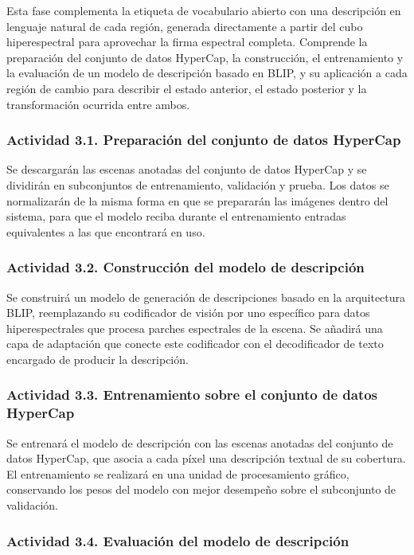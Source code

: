 Esta fase complementa la etiqueta de vocabulario abierto con una descripción en lenguaje natural de cada región, generada directamente a partir del cubo hiperespectral para aprovechar la firma espectral completa. Comprende la preparación del conjunto de datos HyperCap, la construcción, el entrenamiento y la evaluación de un modelo de descripción basado en BLIP, y su aplicación a cada región de cambio para describir el estado anterior, el estado posterior y la transformación ocurrida entre ambos.

\subsubsection{Actividad 3.1. Preparación del conjunto de datos HyperCap}

Se descargarán las escenas anotadas del conjunto de datos HyperCap y se dividirán en subconjuntos de entrenamiento, validación y prueba. Los datos se normalizarán de la misma forma en que se prepararán las imágenes dentro del sistema, para que el modelo reciba durante el entrenamiento entradas equivalentes a las que encontrará en uso.

\subsubsection{Actividad 3.2. Construcción del modelo de descripción}

Se construirá un modelo de generación de descripciones basado en la arquitectura BLIP, reemplazando su codificador de visión por uno específico para datos hiperespectrales que procesa parches espectrales de la escena. Se añadirá una capa de adaptación que conecte este codificador con el decodificador de texto encargado de producir la descripción.

\subsubsection{Actividad 3.3. Entrenamiento sobre el conjunto de datos HyperCap}

Se entrenará el modelo de descripción con las escenas anotadas del conjunto de datos HyperCap, que asocia a cada píxel una descripción textual de su cobertura. El entrenamiento se realizará en una unidad de procesamiento gráfico, conservando los pesos del modelo con mejor desempeño sobre el subconjunto de validación.

\subsubsection{Actividad 3.4. Evaluación del modelo de descripción}


